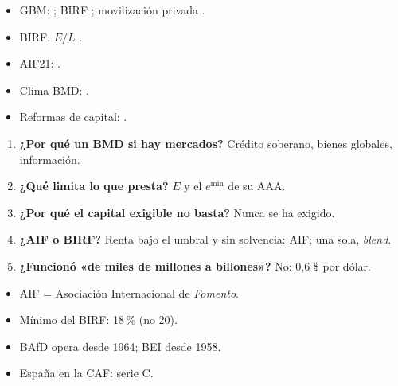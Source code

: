 \documentclass{article}
\begin{document}
\begin{columnas}
\anexorepaso
{}
\begin{itemize}
\item GBM: ; BIRF ; movilización privada .
\item BIRF: $E/L$ .
\item AIF21: .
\item Clima BMD: .
\item Reformas de capital: .
\end{itemize}
\begin{enumerate}
\item \textbf{¿Por qué un BMD si hay mercados?} Crédito soberano, bienes globales, información.
\item \textbf{¿Qué limita lo que presta?} $E$ y el $e^{\min}$ de su AAA.
\item \textbf{¿Por qué el capital exigible no basta?} Nunca se ha exigido.
\item \textbf{¿AIF o BIRF?} Renta bajo el umbral y sin solvencia: AIF; una sola, \emph{blend}.
\item \textbf{¿Funcionó «de miles de millones a billones»?} No: 0,6 \$ por dólar.
\end{enumerate}
\begin{trampa}
\begin{itemize}
\item AIF = Asociación Internacional de \emph{Fomento}.
\item Mínimo del BIRF: 18\,\% (no 20).
\item BAfD opera desde 1964; BEI desde 1958.
\item España en la CAF: serie C.
\end{itemize}
\end{trampa}

\end{columnas}
\end{document}
